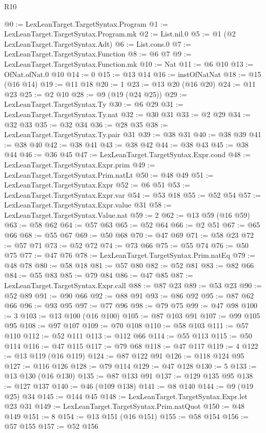 \begin{lexlean}{R10}
\begin{coremodule}
@0 := LexLeanTarget.TargetSyntax.Program
@1 := LexLeanTarget.TargetSyntax.Program.mk
@2 := List.nil.{0}
@5 := @1 (@2 LexLeanTarget.TargetSyntax.Adt)
@6 := List.cons.{0}
@7 := LexLeanTarget.TargetSyntax.Function
@8 := @6 @7
@9 := LexLeanTarget.TargetSyntax.Function.mk
@10 := Nat
@11 := @6 @10
@13 := OfNat.ofNat.{0} @10
@14 := 0
@15 := @13 @14
@16 := instOfNatNat
@18 := @15 (@16 @14)
@19 := @11 @18
@20 := 1
@23 := @13 @20 (@16 @20)
@24 := @11 @23
@25 := @2 @10
@28 := @9 (@19 (@24 @25))
@29 := LexLeanTarget.TargetSyntax.Ty
@30 := @6 @29
@31 := LexLeanTarget.TargetSyntax.Ty.nat
@32 := @30 @31
@33 := @2 @29
@34 := @32 @33
@35 := @32 @34
@36 := @28 @35
@38 := LexLeanTarget.TargetSyntax.Ty.pair @31
@39 := @38 @31
@40 := @38 @39
@41 := @38 @40
@42 := @38 @41
@43 := @38 @42
@44 := @38 @43
@45 := @38 @44
@46 := @36 @45
@47 := LexLeanTarget.TargetSyntax.Expr.cond
@48 := LexLeanTarget.TargetSyntax.Expr.prim
@49 := LexLeanTarget.TargetSyntax.Prim.natLt
@50 := @48 @49
@51 := LexLeanTarget.TargetSyntax.Expr
@52 := @6 @51
@53 := LexLeanTarget.TargetSyntax.Expr.var
@54 := @53 @18
@55 := @52 @54
@57 := LexLeanTarget.TargetSyntax.Expr.value @31
@58 := LexLeanTarget.TargetSyntax.Value.nat
@59 := 2
@62 := @13 @59 (@16 @59)
@63 := @58 @62
@64 := @57 @63
@65 := @52 @64
@66 := @2 @51
@67 := @65 @66
@68 := @55 @67
@69 := @50 @68
@70 := @47 @69
@71 := @58 @23
@72 := @57 @71
@73 := @52 @72
@74 := @73 @66
@75 := @55 @74
@76 := @50 @75
@77 := @47 @76
@78 := LexLeanTarget.TargetSyntax.Prim.natEq
@79 := @48 @78
@80 := @58 @18
@81 := @57 @80
@82 := @52 @81
@83 := @82 @66
@84 := @55 @83
@85 := @79 @84
@86 := @47 @85
@87 := LexLeanTarget.TargetSyntax.Expr.call
@88 := @87 @23
@89 := @53 @23
@90 := @52 @89
@91 := @90 @66
@92 := @88 @91
@93 := @86 @92
@95 := @87 @62 @66
@96 := @93 @95
@97 := @77 @96
@98 := @79 @75
@99 := @47 @98
@100 := 3
@103 := @13 @100 (@16 @100)
@105 := @87 @103 @91
@107 := @99 @105 @95
@108 := @97 @107
@109 := @70 @108
@110 := @58 @103
@111 := @57 @110
@112 := @52 @111
@113 := @112 @66
@114 := @55 @113
@115 := @50 @114
@116 := @47 @115
@117 := @79 @68
@118 := @47 @117
@119 := 4
@122 := @13 @119 (@16 @119)
@124 := @87 @122 @91
@126 := @118 @124 @95
@127 := @116 @126
@128 := @79 @114
@129 := @47 @128
@130 := 5
@133 := @13 @130 (@16 @130)
@135 := @87 @133 @91
@137 := @129 @135 @95
@138 := @127 @137
@140 := @46 (@109 @138)
@141 := @8 @140
@144 := @9 (@19 @25) @34
@145 := @144 @45
@148 := LexLeanTarget.TargetSyntax.Expr.let @23 @31
@149 := LexLeanTarget.TargetSyntax.Prim.natQuot
@150 := @48 @149
@151 := 8
@154 := @13 @151 (@16 @151)
@155 := @58 @154
@156 := @57 @155
@157 := @52 @156

\end{coremodule}
\end{lexlean}
